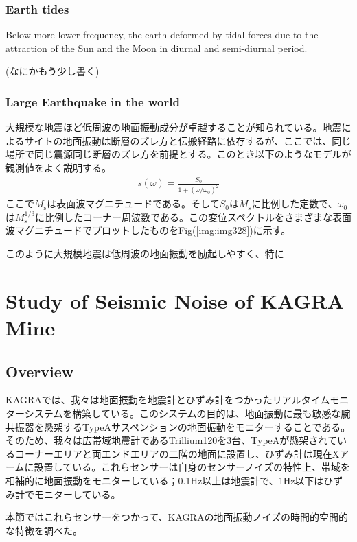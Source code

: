 \subsubsection{Earth tides}
Below more lower frequency, the earth deformed by tidal forces due to the attraction of the Sun and the Moon in diurnal and semi-diurnal period. 

(なにかもう少し書く)

\subsubsection{Large Earthquake in the world}
大規模な地震ほど低周波の地面振動成分が卓越することが知られている\cite{aki2002quantitative,aki1967scaling}。地震によるサイトの地面振動は断層のズレ方と伝搬経路に依存するが、ここでは、同じ場所で同じ震源同じ断層のズレ方を前提とする。このとき以下のようなモデルが観測値をよく説明する。
\begin{eqnarray}
  s(\omega) = \displaystyle\frac{S_0}{1+({\omega}/{\omega_0})^2} 
\end{eqnarray}
ここで$M_{\mathrm{s}}$は表面波マグニチュードである\cite{gutenberg1945study}。そして$S_0$は$M_{\mathrm{s}}$に比例した定数で、$\omega_0$は$M_{\mathrm{s}}^{1/3}$に比例したコーナー周波数である。この変位スペクトルをさまざまな表面波マグニチュードでプロットしたものをFig(\ref{img:img328})に示す。

このように大規模地震は低周波の地面振動を励起しやすく、特に

\section{Study of Seismic Noise of KAGRA Mine} \label{sec:33}
\subsection{Overview}
KAGRAでは、我々は地面振動を地震計とひずみ計をつかったリアルタイムモニターシステムを構築している。このシステムの目的は、地面振動に最も敏感な腕共振器を懸架するTypeAサスペンションの地面振動をモニターすることである。そのため、我々は広帯域地震計であるTrillium120を3台、TypeAが懸架されているコーナーエリアと両エンドエリアの二階の地面に設置し、ひずみ計は現在Xアームに設置している。これらセンサーは自身のセンサーノイズの特性上、帯域を相補的に地面振動をモニターしている；0.1Hz以上は地震計で、1Hz以下はひずみ計でモニターしている。

本節ではこれらセンサーをつかって、KAGRAの地面振動ノイズの時間的空間的な特徴を調べた。

